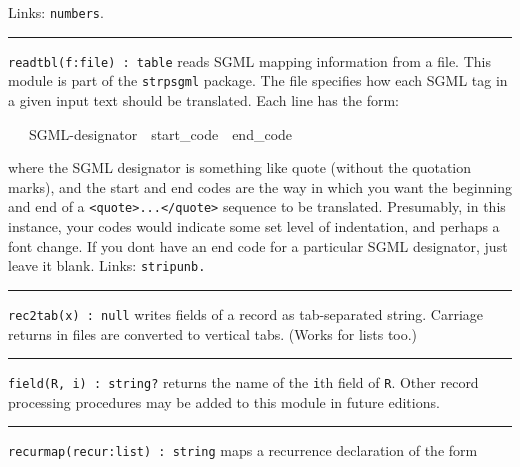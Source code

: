 Links: \texttt{numbers}. 

\vspace{0.25cm}\hrule{}

\texttt{readtbl(f:file) : table} reads SGML mapping
information from a file. This module is part of the \texttt{strpsgml}
package. The file specifies how each SGML tag in a given input text
should be translated. Each line has the form:

\ \ \ SGML-designator\ \ start\_code\ \ end\_code

where the SGML designator is something like
{\textquotedbl}quote{\textquotedbl} (without the quotation marks), and
the start and end codes are the way in which you want the beginning and
end of a
\texttt{{\textless}quote{\textgreater}...{\textless}/quote{\textgreater}}
sequence to be translated. Presumably, in this instance, your codes
would indicate some set level of indentation, and perhaps a font
change. If you don{\textquotesingle}t have an end code for a particular
SGML designator, just leave it blank.
Links: \texttt{stripunb.}

\vspace{0.25cm}\hrule{}

\texttt{rec2tab(x) : null} writes fields of a record as tab-separated
string. Carriage returns in files are converted to vertical tabs.
(Works for lists too.) \ 

\vspace{0.25cm}\hrule{}

\texttt{field(R, i) : string?} returns the name of the \texttt{i}th
field of \texttt{R}. Other record processing procedures may be added to
this module in future editions. 

\vspace{0.25cm}\hrule{}

\texttt{recurmap(recur:list) : string} maps a recurrence declaration of
the form

